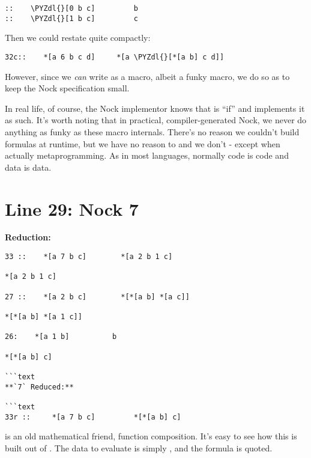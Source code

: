 \begin{framed_shaded}
\begin{Verbatim}[fontsize=\relsize{-2.5},commandchars=\\\{\}]
::    \PYZdl{}[0 b c]         b
::    \PYZdl{}[1 b c]         c
\end{Verbatim}
\end{framed_shaded}
Then we could restate  quite compactly:

\begin{framed_shaded}
\begin{Verbatim}[fontsize=\relsize{-2.5},commandchars=\\\{\}]
32c::    *[a 6 b c d]     *[a \PYZdl{}[*[a b] c d]]
\end{Verbatim}
\end{framed_shaded}

However, since we \emph{can} write  as a macro, albeit a funky macro, we do so
as to keep the Nock specification small.

In real life, of course, the Nock implementor knows that  is ``if'' and
implements it as such. It's worth noting that in practical, compiler-generated
Nock, we never do anything as funky as these  macro internals.  There's no
reason we couldn't build formulas at runtime, but we have no reason to and we
don't - except when actually metaprogramming.  As in most languages, normally
code is code and data is data.

\section{Line 29: Nock 7}

\textbf{ Reduction:}

\begin{framed_shaded}
\begin{Verbatim}[fontsize=\relsize{-2.5},commandchars=\\\{\}]
33 ::    *[a 7 b c]        *[a 2 b 1 c]

*[a 2 b 1 c]

27 ::    *[a 2 b c]        *[*[a b] *[a c]] 

*[*[a b] *[a 1 c]]

26:    *[a 1 b]          b
 
*[*[a b] c]
 
```text
**`7` Reduced:**

```text
33r ::     *[a 7 b c]         *[*[a b] c]
\end{Verbatim}
\end{framed_shaded}
 is an old mathematical friend, function composition.  It's
easy to see how this is built out of .  The data to evaluate
is simply , and the formula is  quoted.


